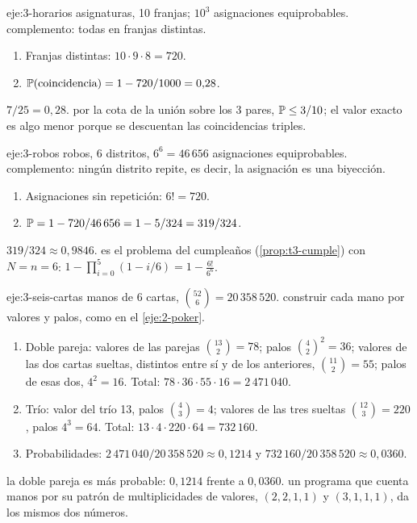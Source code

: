 \begin{solucion}{eje:3-horarios}
 asignaturas, 10 franjas; $10^{3}$ asignaciones equiprobables.
\planteamiento complemento: todas en franjas distintas.
\pasos
\begin{enumerate}[label=\arabic*.]
  \item Franjas distintas: $10\cdot9\cdot8=720$.
  \item $\mathbb{P}(\text{coincidencia})=1-720/1000=0{,}28$.
\end{enumerate}
\resultado $7/25=0{,}28$.
\comprobacion por la cota de la unión sobre los 3 pares, $\mathbb{P}\le3/10$; el valor exacto es algo menor porque se descuentan las coincidencias triples.
\end{solucion}

\begin{solucion}{eje:3-robos}
 robos, 6 distritos, $6^{6}=46\,656$ asignaciones equiprobables.
\planteamiento complemento: ningún distrito repite, es decir, la asignación es una biyección.
\pasos
\begin{enumerate}[label=\arabic*.]
  \item Asignaciones sin repetición: $6!=720$.
  \item $\mathbb{P}=1-720/46\,656=1-5/324=319/324$.
\end{enumerate}
\resultado $319/324\approx0{,}9846$.
\comprobacion es el problema del cumpleaños (\cref{prop:t3-cumple}) con $N=n=6$: $1-\prod_{i=0}^{5}(1-i/6)=1-\frac{6!}{6^{6}}$.
\end{solucion}

\begin{solucion}{eje:3-seis-cartas}
\datos manos de 6 cartas, $\binom{52}6=20\,358\,520$.
\planteamiento construir cada mano por valores y palos, como en el \cref{eje:2-poker}.
\pasos
\begin{enumerate}[label=\arabic*.]
  \item Doble pareja: valores de las parejas $\binom{13}2=78$; palos $\binom42^{2}=36$; valores de las dos cartas sueltas, distintos entre sí y de los anteriores, $\binom{11}2=55$; palos de esas dos, $4^{2}=16$. Total: $78\cdot36\cdot55\cdot16=2\,471\,040$.
  \item Trío: valor del trío 13, palos $\binom43=4$; valores de las tres sueltas $\binom{12}3=220$, palos $4^{3}=64$. Total: $13\cdot4\cdot220\cdot64=732\,160$.
  \item Probabilidades: $2\,471\,040/20\,358\,520\approx0{,}1214$ y $732\,160/20\,358\,520\approx0{,}0360$.
\end{enumerate}
\resultado la doble pareja es más probable: $0{,}1214$ frente a $0{,}0360$.
\comprobacion un programa que cuenta manos por su patrón de multiplicidades de valores, $(2,2,1,1)$ y $(3,1,1,1)$, da los mismos dos números.
\end{solucion}

